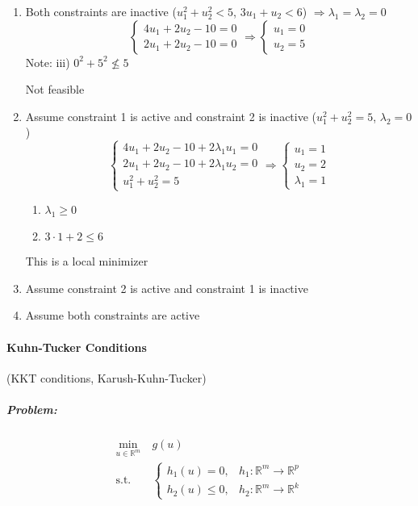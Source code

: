 \documentclass[letterpaper,12pt,titlepage]{report}
\newcommand*\R{\mathbb{R}}
\theoremstyle{plain}
\theoremstyle{definition}
\begin{document}
\begin{enumerate}
\item Both constraints are inactive ($u_1^2 + u_2^2 < 5$, $3u_1 + u_2 < 6$) $\Longrightarrow \lambda_1=\lambda_2=0$
  \[ \begin{cases}
      4u_1 + 2u_2 - 10 = 0 \\
      2u_1 + 2u_2 - 10 = 0
    \end{cases}
    \Longrightarrow
    \begin{cases}
      u_1 = 0 \\
      u_2 = 5
    \end{cases} \]
  Note: iii) $0^2 + 5^2 \nleq 5$

  Not feasible

\item Assume constraint 1 is active and constraint 2 is inactive ($u_1^2 + u_2^2 = 5$, $\lambda_2=0$)
  \[ \begin{cases}
      4u_1 + 2u_2 - 10 + 2\lambda_1u_1 = 0 \\
      2u_1 + 2u_2 - 10 + 2\lambda_1u_2 = 0 \\
      u_1^2 + u_2^2 = 5
    \end{cases}
    \Longrightarrow
    \begin{cases}
      u_1 = 1 \\
      u_2 = 2 \\
      \lambda_1 = 1
    \end{cases} \]
  \begin{enumerate}[label=$\square$\hspace{1pt}\llap{\protect\raisebox{2pt}{$\checkmark$}}]
  \item $\lambda_1 \ge 0$
  \item $3\cdot 1 + 2 \le 6$
  \end{enumerate}
  This is a local minimizer

\item Assume constraint 2 is active and constraint 1 is inactive
\item Assume both constraints are active
\end{enumerate}

\paragraph{Kuhn-Tucker Conditions} (KKT conditions, Karush-Kuhn-Tucker)
\subparagraph{Problem:}
\begin{equation}
  \begin{aligned}
    \min_{u\in\R^m} {}\ & g(u) \\
    \text{s.t. } & \begin{cases}
      h_1(u) = 0, & h_1:\R^m\to\R^p \\
      h_2(u) \le 0, & h_2:\R^m\to\R^k
    \end{cases}
  \end{aligned}
  \label{eq:kkt}
\end{equation}
\end{document}
